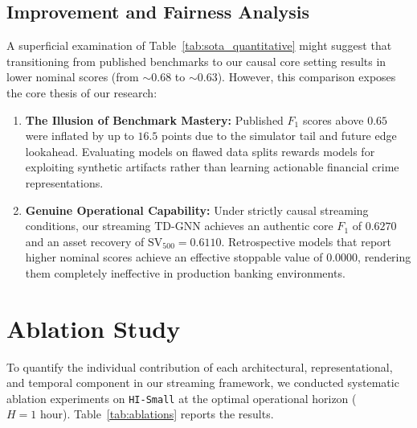 \documentclass[pdflatex,sn-mathphys,Numbered]{sn-jnl}
\theoremstyle{thmstyleone}
\theoremstyle{thmstyletwo}
\theoremstyle{thmstylethree}
\begin{document}
\subsection{Improvement and Fairness Analysis}
A superficial examination of Table~\ref{tab:sota_quantitative} might suggest that transitioning from published benchmarks to our causal core setting results in lower nominal scores (from $\sim0.68$ to $\sim0.63$). However, this comparison exposes the core thesis of our research:
\begin{enumerate}
    \item \textbf{The Illusion of Benchmark Mastery:} Published $F_1$ scores above $0.65$ were inflated by up to $16.5$ points due to the simulator tail and future edge lookahead. Evaluating models on flawed data splits rewards models for exploiting synthetic artifacts rather than learning actionable financial crime representations.
    \item \textbf{Genuine Operational Capability:} Under strictly causal streaming conditions, our streaming TD-GNN achieves an authentic core $F_1$ of \textbf{$0.6270$} and an asset recovery of \textbf{$\text{SV}_{500} = 0.6110$}. Retrospective models that report higher nominal scores achieve an effective stoppable value of \textbf{$0.0000$}, rendering them completely ineffective in production banking environments.
\end{enumerate}

\section{Ablation Study}
\label{sec:ablations}

To quantify the individual contribution of each architectural, representational, and temporal component in our streaming framework, we conducted systematic ablation experiments on \texttt{HI-Small} at the optimal operational horizon ($H=1\text{ hour}$). Table~\ref{tab:ablations} reports the results.
\end{document}
